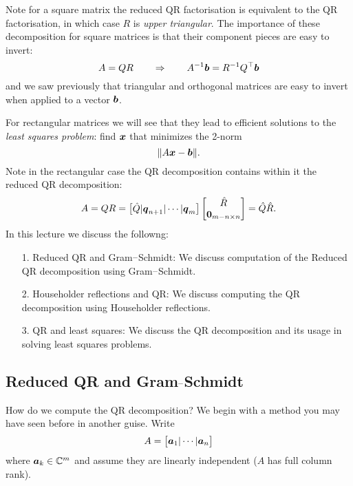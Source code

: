 Note for a square matrix the reduced QR factorisation is equivalent to the QR factorisation, in which case $R$ is \emph{upper triangular}. The importance of these decomposition for square matrices is that their component pieces are easy to invert:
\[
A = QR \qquad \Rightarrow \qquad A^{-1}\bm{{\mbox{\boldmath$b$\unboldmath}}} = R^{-1} Q^\top \bm{{\mbox{\boldmath$b$\unboldmath}}}
\]
and we saw previously that triangular and orthogonal matrices are easy to invert when applied to a vector $\bm{{\mbox{\boldmath$b$\unboldmath}}}$.

For rectangular matrices we will see that they lead to efficient solutions to the \emph{least squares problem}: find $\bm{{\mbox{\boldmath$x$\unboldmath}}}$ that minimizes the 2-norm
\[
\| A \bm{{\mbox{\boldmath$x$\unboldmath}}} - \bm{{\mbox{\boldmath$b$\unboldmath}}} \|.
\]
Note in the rectangular case the QR decomposition contains within it the reduced QR decomposition:
\[
A = QR = \begin{bmatrix} \hat Q | \bm{{\mbox{\boldmath$q$\unboldmath}}}_{n+1} | \cdots | \bm{{\mbox{\boldmath$q$\unboldmath}}}_m \end{bmatrix} \begin{bmatrix} \hat R \\  \bm{{\mbox{\boldmath$0$\unboldmath}}}_{m-n \times n} \end{bmatrix} = \hat Q \hat R.
\]
In this lecture we discuss the followng:

\begin{itemize}
\item[1. ] Reduced QR and Gram\ensuremath{\endash}Schmidt: We discuss computation of the Reduced QR decomposition using Gram\ensuremath{\endash}Schmidt.


\item[2. ] Householder reflections and QR: We discuss computing the  QR decomposition using Householder reflections.


\item[3. ] QR and least squares: We discuss the QR decomposition and its usage in solving least squares problems.

\end{itemize}
\subsection{Reduced QR and Gram\ensuremath{\endash}Schmidt}
How do we compute the QR decomposition? We begin with a method you may have seen before in another guise. Write
\[
A = \begin{bmatrix} \bm{{\mbox{\boldmath$a$\unboldmath}}}_1 | \cdots | \bm{{\mbox{\boldmath$a$\unboldmath}}}_n \end{bmatrix}
\]
where $\bm{{\mbox{\boldmath$a$\unboldmath}}}_k \in  {\mathbb C}^m$ and assume they are linearly independent ($A$ has full column rank).

